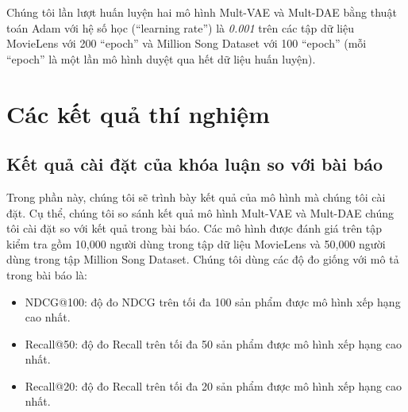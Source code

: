 Chúng tôi lần lượt huấn luyện hai mô hình Mult-VAE và Mult-DAE bằng thuật toán Adam \cite{Goodfellow-et-al-2016-Book} với hệ số học (``learning rate'') là \textit{0.001} trên các tập dữ liệu MovieLens \cite{Ml20M} với 200 ``epoch'' và Million Song Dataset \cite{MSD} với 100 ``epoch'' (mỗi ``epoch'' là một lần mô hình duyệt qua hết dữ liệu huấn luyện).







\section{Các kết quả thí nghiệm}
    \subsection{Kết quả cài đặt của khóa luận so với bài báo}
    \label{experiment1}
    Trong phần này, chúng tôi sẽ trình bày kết quả của mô hình mà chúng tôi cài đặt. 
    Cụ thể, chúng tôi so sánh kết quả mô hình Mult-VAE và Mult-DAE chúng tôi cài đặt so với kết quả trong bài báo.
    Các mô hình được đánh giá trên tập kiểm tra gồm 10,000 người dùng trong tập dữ liệu MovieLens và 50,000 người dùng trong tập Million Song Dataset.
    Chúng tôi dùng các độ đo giống với mô tả trong bài báo là:
    \begin{itemize}
        \item NDCG@100: độ đo NDCG trên tối đa 100 sản phẩm được mô hình xếp hạng cao nhất.
        \item Recall@50: độ đo Recall trên tối đa 50 sản phẩm được mô hình xếp hạng cao nhất.
        \item Recall@20: độ đo Recall trên tối đa 20 sản phẩm được mô hình xếp hạng cao nhất.
    \end{itemize}

